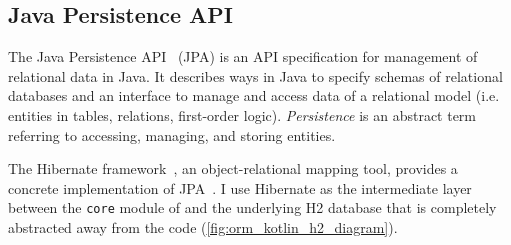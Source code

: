 \subsection{Java Persistence API}

The Java Persistence API~\cite{BiswasJavaPersistenceAPI2016} (JPA) is an API specification for management of relational data in Java.
It describes ways in Java to specify schemas of relational databases and an interface to manage and access data of a relational model (i.e. entities in tables, relations, first-order logic).
\textsl{Persistence} is an abstract term referring to accessing, managing, and storing entities.

The Hibernate framework~\cite{ElliottHibernateDeveloperNotebook2004}, an object-relational mapping tool, provides a concrete implementation of JPA~\cite{BauerJavaPersistenceHibernate2015}.
I use Hibernate as the intermediate layer between the \texttt{core} module of \graffs and the underlying H2 database that is completely abstracted away from the \graffs code (\autoref{fig:orm_kotlin_h2_diagram}).





